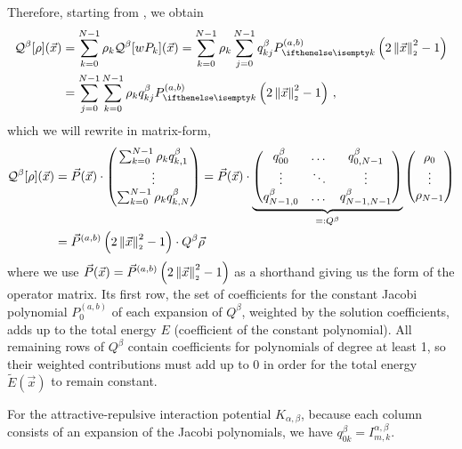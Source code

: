 Therefore, starting from , we obtain
\begin{align*}
  \mathcal{Q}^\beta[\rho](\vec{x}) & = \sum_{k=0}^{N-1} \rho_k \mathcal{Q}^\beta[wP_k](\vec{x}) = \sum_{k=0}^{N-1} \rho_k \sum_{j=0}^{N-1} q^{\beta}_{kj} \jacobi{x} \\
                                   & = \sum_{j=0}^{N-1} \sum_{k=0}^{N-1} \rho_k q^{\beta}_{kj} \jacobi{x}\,,
\end{align*}
which we will rewrite in matrix-form,
\begin{align*}
  \mathcal{Q}^\beta[\rho](\vec{x}) & = \vec{P}(\vec{x}) \cdot
  \begin{pmatrix}
    \sum_{k=0}^{N-1} \rho_k q^{\beta}_{k,1} \\
    \vdots                                  \\
    \sum_{k=0}^{N-1} \rho_k q^{\beta}_{k,N}
  \end{pmatrix} = \vec{P}(\vec{x}) \cdot
  \underbrace{
    \begin{pmatrix}
      q^{\beta}_{00}    & \dots  & q^{\beta}_{0,N-1}   \\
      \vdots            & \ddots & \vdots              \\
      q^{\beta}_{N-1,0} & \dots  & q^{\beta}_{N-1,N-1} \\
    \end{pmatrix}
  }_{=: Q^\beta}
  \begin{pmatrix}
    \rho_0 \\
    \vdots \\
    \rho_{N-1}
  \end{pmatrix}                                                              \\
                                   & = \vec{P}^{(a, b)}\left(2 \left\lVert\vec{x}\right\rVert_{\scriptscriptstyle 2}^2 - 1\right) \cdot Q^\beta \vec{\rho}
\end{align*}
where we use $\vec{P}(\vec{x}) = \vec{P}^{(a, b)}\left(2 \left\lVert\vec{x}\right\rVert_{\scriptscriptstyle 2}^2 - 1\right)$ as a shorthand giving us the form of the operator matrix.
Its first row, the set of coefficients for the constant Jacobi polynomial $P_0^{(a,b)}$ of each expansion of $Q^\beta$, weighted by the solution coefficients, adds up to the total energy $E$ (coefficient of the constant polynomial).
All remaining rows of $Q^\beta$ contain coefficients for polynomials of degree at least 1, so their weighted contributions must add up to 0 in order for the total energy $\tilde{E}(\vec{x})$ to remain constant.

For the attractive-repulsive interaction potential $K_{\alpha,\beta}$, because each column consists of an expansion of the Jacobi polynomials, we have $q^{\beta}_{0k} = I_{m,k}^{\alpha,\beta}$.

